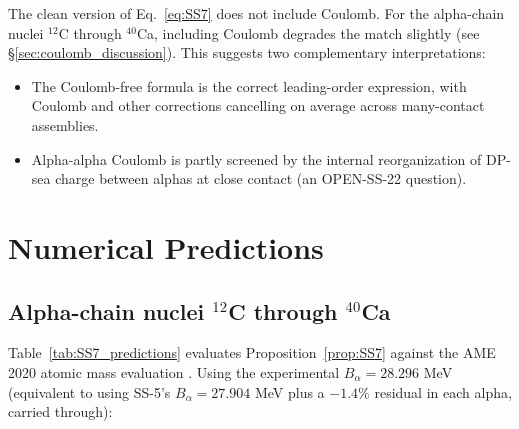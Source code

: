 \documentclass[11pt,letterpaper]{article}
\newcommand{\Balpha}{B_{\alpha}}
\begin{document}
The clean version of Eq.~\ref{eq:SS7} does not include Coulomb. For the alpha-chain nuclei ${}^{12}$C through ${}^{40}$Ca, including Coulomb degrades the match slightly (see §\ref{sec:coulomb_discussion}). This suggests two complementary interpretations:
\begin{itemize}
\item The Coulomb-free formula is the correct leading-order expression, with Coulomb and other corrections cancelling on average across many-contact assemblies.
\item Alpha-alpha Coulomb is partly screened by the internal reorganization of DP-sea charge between alphas at close contact (an OPEN-SS-22 question).
\end{itemize}

\section{Numerical Predictions}
\label{sec:predictions}

\subsection{Alpha-chain nuclei ${}^{12}$C through ${}^{40}$Ca}

Table~\ref{tab:SS7_predictions} evaluates Proposition~\ref{prop:SS7} against the AME 2020 atomic mass evaluation \cite{ame2020}. Using the experimental $\Balpha = 28.296$ MeV (equivalent to using SS-5's $\Balpha = 27.904$ MeV plus a $-1.4\%$ residual in each alpha, carried through):
\end{document}
